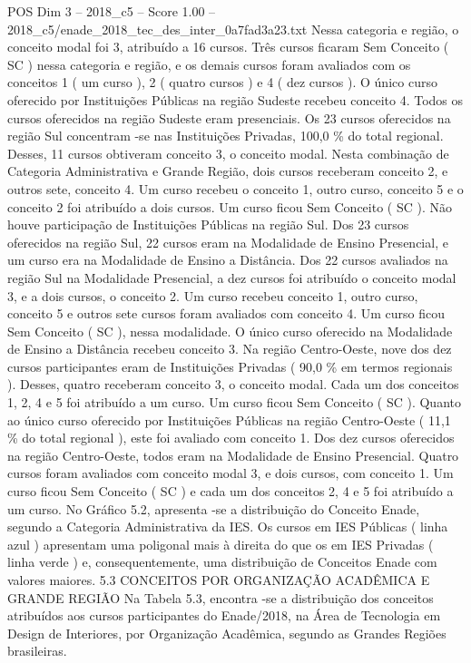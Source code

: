 \begin{textsample}{POS Dim 3 – 2018\_c5 – Score 1.00 – 2018\_c5/enade\_2018\_tec\_des\_inter\_0a7fad3a23.txt}
Nessa categoria e região, o conceito modal foi 3, atribuído a 16 cursos.
Três cursos ficaram Sem Conceito ( SC ) nessa categoria e região, e os demais cursos foram avaliados com os conceitos 1 ( um curso ), 2 ( quatro cursos ) e 4 ( dez cursos ).
O único curso oferecido por Instituições Públicas na região Sudeste recebeu conceito 4.
Todos os cursos oferecidos na região Sudeste eram presenciais.
Os 23 cursos oferecidos na região Sul concentram -se nas Instituições Privadas, 100,0 \% do total regional.
Desses, 11 cursos obtiveram conceito 3, o conceito modal.
Nesta combinação de Categoria Administrativa e Grande Região, dois cursos receberam conceito 2, e outros sete, conceito 4.
Um curso recebeu o conceito 1, outro curso, conceito 5 e o conceito 2 foi atribuído a dois cursos.
Um curso ficou Sem Conceito ( SC ).
Não houve participação de Instituições Públicas na região Sul.
Dos 23 cursos oferecidos na região Sul, 22 cursos eram na Modalidade de Ensino Presencial, e um curso era na Modalidade de Ensino a Distância.
Dos 22 cursos avaliados na região Sul na Modalidade Presencial, a dez cursos foi atribuído o conceito modal 3, e a dois cursos, o conceito 2.
Um curso recebeu conceito 1, outro curso, conceito 5 e outros sete cursos foram avaliados com conceito 4.
Um curso ficou Sem Conceito ( SC ), nessa modalidade.
O único curso oferecido na Modalidade de Ensino a Distância recebeu conceito 3.
Na região Centro-Oeste, nove dos dez cursos participantes eram de Instituições Privadas ( 90,0 \% em termos regionais ).
Desses, quatro receberam conceito 3, o conceito modal.
Cada um dos conceitos 1, 2, 4 e 5 foi atribuído a um curso.
Um curso ficou Sem Conceito ( SC ).
Quanto ao único curso oferecido por Instituições Públicas na região Centro-Oeste ( 11,1 \% do total regional ), este foi avaliado com conceito 1.
Dos dez cursos oferecidos na região Centro-Oeste, todos eram na Modalidade de Ensino Presencial.
Quatro cursos foram avaliados com conceito modal 3, e dois cursos, com conceito 1.
Um curso ficou Sem Conceito ( SC ) e cada um dos conceitos 2, 4 e 5 foi atribuído a um curso.
No Gráfico 5.2, apresenta -se a distribuição do Conceito Enade, segundo a Categoria Administrativa da IES.
Os cursos em IES Públicas ( linha azul ) apresentam uma poligonal mais à direita do que os em IES Privadas ( linha verde ) e, consequentemente, uma distribuição de Conceitos Enade com valores maiores. 5.3 CONCEITOS POR ORGANIZAÇÃO ACADÊMICA E GRANDE REGIÃO Na Tabela 5.3, encontra -se a distribuição dos conceitos atribuídos aos cursos participantes do Enade/2018, na Área de Tecnologia em Design de Interiores, por Organização Acadêmica, segundo as Grandes Regiões brasileiras.

\end{textsample}
